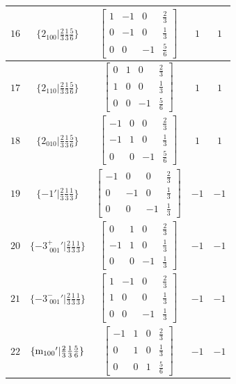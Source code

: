 \documentclass[fleqn,8pt]{jsarticle}
\begin{document}
\begin{longtable}{ccccc}
$ 16 $ & $ \{2{}_{100}|\frac{2}{3} \frac{1}{3} \frac{5}{6}\} $ & $ \begin{bmatrix} 1 & -1 & 0 & \frac{2}{3} \\ 0 & -1 & 0 & \frac{1}{3} \\ 0 & 0 & -1 & \frac{5}{6} \end{bmatrix} $ & $ 1 $ & $ 1 $ \\ \hline
$ 17 $ & $ \{2{}_{110}|\frac{2}{3} \frac{1}{3} \frac{5}{6}\} $ & $ \begin{bmatrix} 0 & 1 & 0 & \frac{2}{3} \\ 1 & 0 & 0 & \frac{1}{3} \\ 0 & 0 & -1 & \frac{5}{6} \end{bmatrix} $ & $ 1 $ & $ 1 $ \\ \hline
$ 18 $ & $ \{2{}_{010}|\frac{2}{3} \frac{1}{3} \frac{5}{6}\} $ & $ \begin{bmatrix} -1 & 0 & 0 & \frac{2}{3} \\ -1 & 1 & 0 & \frac{1}{3} \\ 0 & 0 & -1 & \frac{5}{6} \end{bmatrix} $ & $ 1 $ & $ 1 $ \\ \hline
$ 19 $ & $ \{-1{}'|\frac{2}{3} \frac{1}{3} \frac{1}{3}\} $ & $ \begin{bmatrix} -1 & 0 & 0 & \frac{2}{3} \\ 0 & -1 & 0 & \frac{1}{3} \\ 0 & 0 & -1 & \frac{1}{3} \end{bmatrix} $ & $ -1 $ & $ -1 $ \\ \hline
$ 20 $ & $ \{-3^{+}_{\,\,001}{}'|\frac{2}{3} \frac{1}{3} \frac{1}{3}\} $ & $ \begin{bmatrix} 0 & 1 & 0 & \frac{2}{3} \\ -1 & 1 & 0 & \frac{1}{3} \\ 0 & 0 & -1 & \frac{1}{3} \end{bmatrix} $ & $ -1 $ & $ -1 $ \\ \hline
$ 21 $ & $ \{-3^{-}_{\,\,001}{}'|\frac{2}{3} \frac{1}{3} \frac{1}{3}\} $ & $ \begin{bmatrix} 1 & -1 & 0 & \frac{2}{3} \\ 1 & 0 & 0 & \frac{1}{3} \\ 0 & 0 & -1 & \frac{1}{3} \end{bmatrix} $ & $ -1 $ & $ -1 $ \\ \hline
$ 22 $ & $ \{{\rm m}_{100}{}'|\frac{2}{3} \frac{1}{3} \frac{5}{6}\} $ & $ \begin{bmatrix} -1 & 1 & 0 & \frac{2}{3} \\ 0 & 1 & 0 & \frac{1}{3} \\ 0 & 0 & 1 & \frac{5}{6} \end{bmatrix} $ & $ -1 $ & $ -1 $ \\ \hline

\end{longtable}
\end{document}
